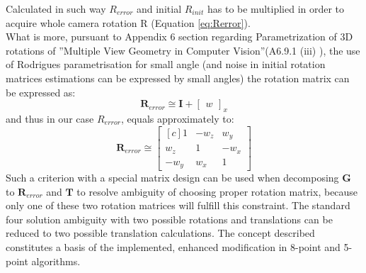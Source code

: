 Calculated in such way $R_{error}$ and initial $R_{init}$ has to be multiplied in order to acquire whole camera rotation R (Equation \ref{eq:Rerror}). \\
What is more, pursuant to Appendix 6 section regarding Parametrization of 3D rotations of ''Multiple View Geometry in Computer Vision''(A6.9.1 (iii) \cite{HartleyMultipleView}), the use of Rodrigues parametrisation for small angle (and noise in initial rotation matrices estimations can be expressed by small angles) the rotation matrix can be expressed as:
\begin{equation} \label{eq:rodiguesErrorSimple}
\textbf{R}_{error} \cong \textbf{I} + \begin{bmatrix}w\end{bmatrix}_{x}
\end{equation}
and thus in our case $R_{error}$, equals approximately to:
\begin{equation} \label{eq:rodiguesError}
\textbf{R}_{error} \cong 
\begin{bmatrix*}[c]
    1   &  -w_{z}&  w_{y}\\ 
 w_{z}  &    1   & -w_{x}\\
-w_{y}  &  w_{x} &   1
\end{bmatrix*}
\end{equation} 
Such a criterion with a special matrix design can be used when decomposing \textbf{G} to $\textbf{R}_{error}$ and $\textbf{T}$ to resolve ambiguity of choosing proper rotation matrix, because only one of these two rotation matrices will fulfill this constraint. The standard four solution ambiguity with two possible rotations and translations can be reduced to two possible translation calculations. The concept described constitutes a basis of the implemented, enhanced modification in 8-point and 5-point algorithms.

